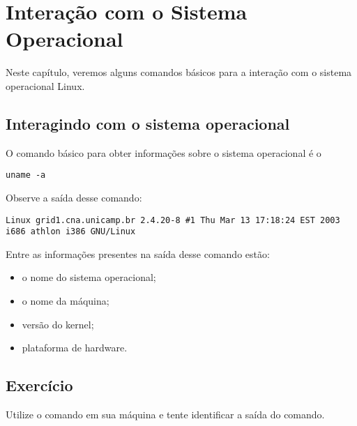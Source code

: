 \chapter{Interação com o Sistema Operacional}
Neste capítulo, veremos alguns comandos básicos para a interação com o sistema operacional Linux. 

\section{Interagindo com o sistema operacional}
O comando básico para obter informações sobre o sistema operacional é o

\begin{lstlisting}[style=MyBashStyle]
uname -a
\end{lstlisting}



Observe a saída desse comando:
\begin{lstlisting}[style=outputStyle]
Linux grid1.cna.unicamp.br 2.4.20-8 #1 Thu Mar 13 17:18:24 EST 2003 i686 athlon i386 GNU/Linux
\end{lstlisting}

Entre as informações presentes na saída desse comando estão:
\begin{itemize}
\setlength{\itemsep}{1pt}\setlength{\parskip}{0pt}  \setlength{\parsep}{0pt}
\item o nome do sistema operacional;
\item o nome da máquina;
\item versão do kernel;
\item plataforma de hardware.
\end{itemize}

\section{Exercício}
Utilize o comando  em sua máquina e tente identificar a saída do comando.
